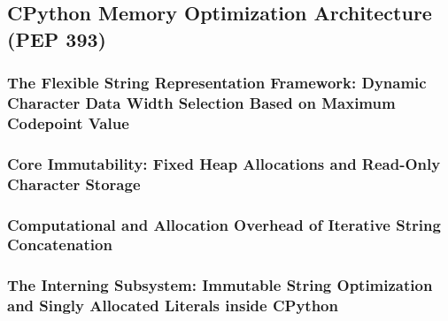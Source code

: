 \subsection{CPython Memory Optimization Architecture (PEP 393)}
\subsubsection{The Flexible String Representation Framework: Dynamic Character Data Width Selection Based on Maximum Codepoint Value}
\subsubsection{Core Immutability: Fixed Heap Allocations and Read-Only Character Storage}
\subsubsection{Computational and Allocation Overhead of Iterative String Concatenation}
\subsubsection{The Interning Subsystem: Immutable String Optimization and Singly Allocated Literals inside CPython}
